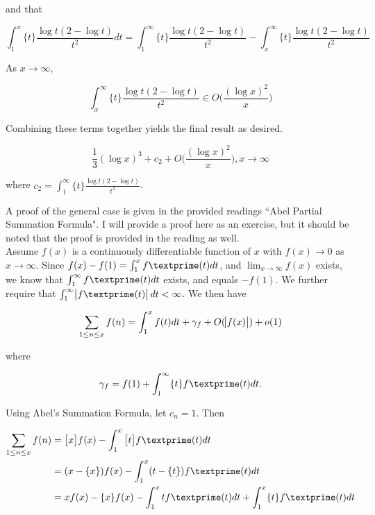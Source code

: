 \documentclass{article}
\begin{document}
and that 

\begin{equation*}
    \int_{1}^{x} \{t\} \frac{\log t(2 - \log t)}{t^2} dt = \int_{1}^{\infty} \{t\} \frac{\log t(2 - \log t)}{t^2} -\int_{x}^{\infty} \{t\} \frac{\log t(2 - \log t)}{t^2}
\end{equation*}

As $x \rightarrow \infty$, 

\begin{equation*}
    \int_{x}^{\infty} \{t\} \frac{\log t(2 - \log t)}{t^2} \in O\bigg(\frac{(\log x)^2}{x}\bigg)
\end{equation*}

Combining these terms together yields the final result as desired.

\begin{equation*}
    \frac{1}{3}(\log x)^3 + c_2 + O\bigg(\frac{(\log x)^2}{x}\bigg), x \rightarrow \infty
\end{equation*}

where $c_2 = \int_{1}^{\infty} \{t\} \frac{\log t(2 - \log t)}{t^2}$.

\newpage

A proof of the general case is given in the provided readings ``Abel Partial Summation Formula". I will provide a proof here as an exercise, but it should be noted that the proof is provided in the reading as well. \\

Assume $f(x)$ is a continuously differentiable function of $x$ with $f(x) \rightarrow 0$ as $x \rightarrow \infty$. Since $f(x) - f(1) = \int_{1}^x f\textprime (t) dt$, and $\lim_{x \to \infty} f(x)$ exists, we know that $\int_{1}^\infty f\textprime (t) dt$ exists, and equals $-f(1)$. We further require that $\int_{1}^\infty \abs{f\textprime (t)} dt < \infty$. We then have 

\begin{equation*}
    \sum_{1\leq n \leq x} f(n) = \int_{1}^x f(t) dt + \gamma_f + O(\abs{f(x)}) + o(1)
\end{equation*}

where 

\begin{equation*}
    \gamma_f = f(1) + \int_{1}^\infty \{t\}f\textprime (t) dt.
\end{equation*}

Using Abel's Summation Formula, let $c_n = 1$. Then 

\begin{equation*}
\begin{split}
    \sum_{1\leq n \leq x} f(n) &= \big[x\big]f(x) - \int_{1}^x \big[t\big] f\textprime (t) dt \\
    &= (x - \{x\}) f(x) - \int_{1}^x (t - \{t\}) f\textprime (t) dt \\
    &= xf(x) - \{x\}f(x) - \int_{1}^x t f\textprime (t) dt + \int_{1}^x \{t\} f\textprime (t) dt \\
\end{split}    
\end{equation*}
\end{document}
